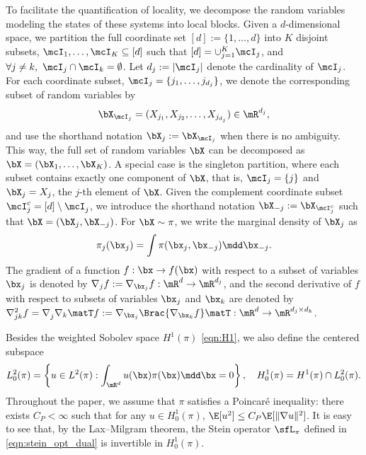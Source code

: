 \documentclass[11pt]{article}
\begin{document}
To facilitate the quantification of locality, we decompose the random variables modeling the states of these systems into local blocks.
%
Given a $d$-dimensional space, we partition the full coordinate set $[d] := \{1,\dots,d\}$ into $K$ disjoint subsets, $\mcI_1, \ldots, \mcI_K \subseteq [d]$ such that $[d] = \cup_{j = 1}^K \mcI_j$, and $\forall j \neq k, ~ \mcI_j \cap \mcI_k = \emptyset$.
Let $d_j := |\mcI_j|$ denote the cardinality of $\mcI_j$. For each coordinate subset, $\mcI_j = \{j_1,\dots,j_{d_j}\}$, we denote the corresponding subset of random variables by 
\begin{equation}
    \bX_{\mcI_j} = ( X_{j_1}, X_{j_2}, \dots, X_{j_{d_j}} ) \in \mR^{d_j}, 
\end{equation}
and use the shorthand notation $\bX_{j} := \bX_{\mcI_j}$ when there is no ambiguity. This way, the full set of random variables $\bX$ can be decomposed as $\bX = (\bX_1, \ldots, \bX_K)$.
%
A special case is the singleton partition, where each subset contains exactly one component of $\bX$, that is, $\mcI_j = \{j\}$ and $\bX_j = X_j$, the $j$-th element of $\bX$. Given the complement coordinate subset $\mcI_j^c = [d] \setminus \mcI_j^{}$, we introduce the shorthand notation $\bX_{-j} := \bX_{\mcI^c_j}$ such that $\bX = (\bX_j, \bX_{-j})$. For $\bX \sim \pi$, we write the marginal density of $\bX_j$ as
\begin{equation}
    \pi_j (\bx_j) = \int \pi(\bx_j,\bx_{-j}) \mdd \bx_{-j}.
\end{equation}
The gradient of a function $f : \bx \rightarrow f(\bx)$ with respect to a subset of variables $\bx_{j}$ is denoted by $\nabla_j f := \nabla_{\bx_j} f: \mR^{d} \rightarrow \mR^{d_j}$, and the second derivative of $f$ with respect to subsets of variables $\bx_{j}$ and $\bx_{k}$ are denoted by $\nabla_{jk}^2 f = \nabla_j^{} \nabla_k\matT f := \nabla_{\bx_j} \Brac{ \nabla_{\bx_k} f }\matT : \mR^{d} \rightarrow \mR^{d_j \times d_k}$.



Besides the weighted Sobolev space $H^1(\pi)$ \eqref{eqn:H1}, we also define the centered subspace
\begin{equation}
    L_0^2(\pi) = \left\{ u \in L^2(\pi) : \int_{\mR^d} u(\bx) \pi(\bx) \mdd \bx = 0 \right\}, \quad H_0^1(\pi) = H^1(\pi) \cap L_0^2(\pi).
\end{equation}
Throughout the paper, we assume that $\pi$ satisfies a Poincar\'e inequality: there exists $C_P < \infty$ such that for any $u \in H_0^1(\pi)$, $\E [u^2] \le C_P \E [\|\nabla u\|^2]$.
It is easy to see that, by the Lax--Milgram theorem, the Stein operator $\sfL_\pi$ defined in \eqref{eqn:stein_opt_dual} is invertible in $H_0^1(\pi)$.
\end{document}
